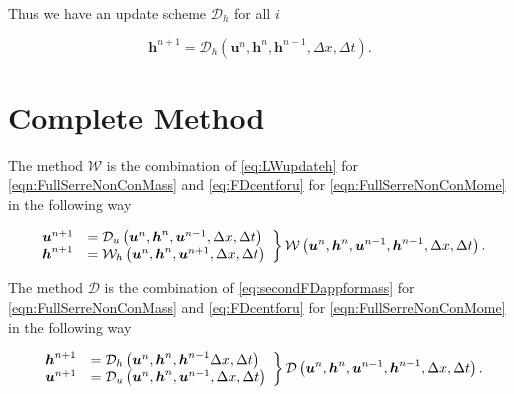 Thus we have an update scheme $\mathcal{D}_h$ for all $i$

	\begin{equation}
	\label{eq:secondFDappformass}
	\boldsymbol{h}^{n+1} = \mathcal{D}_h\left(\boldsymbol{u}^n,\boldsymbol{h}^n,\boldsymbol{h}^{n-1} ,\Delta x, \Delta t \right).
	\end{equation}



\section{Complete Method}
The method $\mathcal{W}$ is the combination of \eqref{eq:LWupdateh} for \eqref{eqn:FullSerreNonConMass} and \eqref{eq:FDcentforu} for \eqref{eqn:FullSerreNonConMome} in the following way

	\begin{equation}
	\left.
	\begin{array}{l l}
	\boldsymbol{u}^{n+1}&=\mathcal{D}_u\left(\boldsymbol{u}^n,\boldsymbol{h}^n, \boldsymbol{u}^{n-1}, \Delta x, \Delta t \right) \\
	\boldsymbol{h}^{n+1}&=\mathcal{W}_h\left(\boldsymbol{u}^n,\boldsymbol{h}^n,\boldsymbol{u}^{n+1}, \Delta x, \Delta t \right)
	\end{array} \right\rbrace \mathcal{W}\left(\boldsymbol{u}^n,\boldsymbol{h}^n, \boldsymbol{u}^{n-1},\boldsymbol{h}^{n-1}, \Delta x, \Delta t \right).	 
	\label{eq:Wnumdef}
	\end{equation}


The method $\mathcal{D}$ is the combination of \eqref{eq:secondFDappformass} for \eqref{eqn:FullSerreNonConMass} and \eqref{eq:FDcentforu} for \eqref{eqn:FullSerreNonConMome} in the following way

	\begin{equation}
	\left.
	\begin{array}{l l}
	\boldsymbol{h}^{n+1}&=\mathcal{D}_h\left(\boldsymbol{u}^n,\boldsymbol{h}^n,\boldsymbol{h}^{n-1} \Delta x, \Delta t \right) \\
	\boldsymbol{u}^{n+1}&=\mathcal{D}_u\left(\boldsymbol{u}^n,\boldsymbol{h}^n, \boldsymbol{u}^{n-1}, \Delta x, \Delta t \right)
	\end{array} \right\rbrace \mathcal{D}\left(\boldsymbol{u}^n,\boldsymbol{h}^n, \boldsymbol{u}^{n-1},\boldsymbol{h}^{n-1}, \Delta x, \Delta t \right).
	\label{eq:Dnumdef}
	\end{equation}


